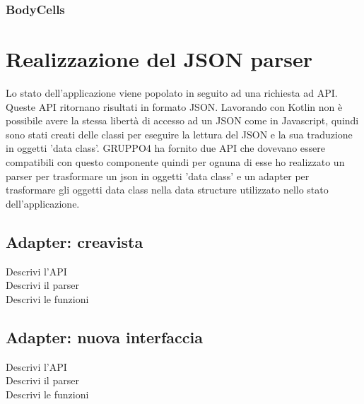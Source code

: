 \subsubsection{BodyCells}

\section{Realizzazione del JSON parser}
Lo stato dell'applicazione viene popolato in seguito ad una richiesta ad API. Queste API ritornano risultati in formato JSON. Lavorando con Kotlin non è possibile avere la stessa libertà di accesso ad un JSON come in Javascript, quindi sono stati creati delle classi per eseguire la lettura del JSON e la sua traduzione in oggetti 'data class'. GRUPPO4 ha fornito due API che dovevano essere compatibili con questo componente quindi per ognuna di esse ho realizzato un parser per trasformare un json in oggetti 'data class' e un adapter per trasformare gli oggetti data class nella data structure utilizzato nello stato dell'applicazione.

\subsection{Adapter: creavista}
Descrivi l'API\\
Descrivi il parser\\
Descrivi le funzioni\\

\subsection{Adapter: nuova interfaccia}
Descrivi l'API\\
Descrivi il parser\\
Descrivi le funzioni\\




